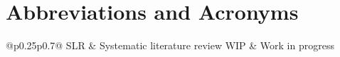\chapter*{Abbreviations and Acronyms}


\noindent
\begin{longtable}{@{}p{}p{}@{}}
SLR & Systematic literature review
WIP & Work in progress


\end{longtable}

